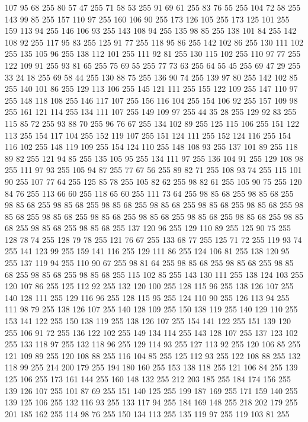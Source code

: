 107 95 68 255 80 57 47 255 71 58 53 255 91 69 61 255 83 76 55 255 104 72 58 255 143 99 85 255 157 110 97 255 160 106 90 255 173 126 105 255 173 125 101 255 159 113 94 255 146 106 93 255 143 108 94 255 135 98 85 255 138 101 84 255 142 108 92 255 117 95 83 255 125 91 77 255 118 95 86 255 142 102 86 255 130 111 102 255 135 105 96 255 138 112 101 255 111 92 81 255 130 115 102 255 110 97 77 255 122 109 91 255 93 81 65 255 75 69 55 255 77 73 63 255 64 55 45 255 69 47 29 255 33 24 18 255 69 58 44 255 130 88 75 255 136 90 74 255 139 97 80 255 142 102 85 255 140 101 86 255 129 113 106 255 145 121 111 255 155 122 109 255 147 110 97 255 148 118 108 255 146 117 107 255 156 116 104 255 154 106 92 255 157 109 98 255 161 121 114 255 134 111 107 255 149 109 97 255 44 35 28 255 129 92 83 255 115 85 72 255 93 88 70 255 96 76 67 255 134 102 89 255 125 115 106 255 151 122 113 255 154 117 104 255 152 119 107 255 151 124 111 255 152 124 116 255
154 116 102 255 148 119 109 255 154 124 110 255 148 108 93 255 137 101 89 255 118 89 82 255 121 94 85 255 135 105 95 255 134 111 97 255 136 104 91 255 129 108 98 255 111 97 93 255 105 94 87 255 77 67 56 255 89 82 71 255 108 93 74 255 115 101 90 255 107 77 64 255 125 85 78 255 105 82 62 255 98 82 61 255 105 90 75 255 120 84 76 255 113 66 60 255 118 65 60 255 111 73 64 255 98 85 68 255 98 85 68 255 98 85 68 255 98 85 68 255 98 85 68 255 98 85 68 255 98 85 68 255 98 85 68 255 98 85 68 255 98 85 68 255 98 85 68 255 98 85 68 255 98 85 68 255 98 85 68 255 98 85 68 255 98 85 68 255 98 85 68 255 137 120 96 255 129 110 89 255 125 90 75 255 128 78 74 255 128 79 78 255 121 76 67 255 133 68 77 255 125 71 72 255 119 93 74 255 141 123 99 255 159 141 116 255 129 111 86 255 124 106 81 255 138 120 95 255 137 119 94 255 110 90 67 255 98 81 64 255 98 85 68 255 98 85 68 255 98 85 68 255 98 85 68 255
98 85 68 255 115 102 85 255 143 130 111 255 138 124 103 255 120 107 86 255 125 112 92 255 132 120 100 255 128 115 96 255 138 126 107 255 140 128 111 255 129 116 96 255 128 115 95 255 124 110 90 255 126 113 94 255 111 98 79 255 138 126 107 255 140 128 109 255 150 138 119 255 140 129 110 255 153 141 122 255 150 138 119 255 138 126 107 255 154 141 122 255 151 139 120 255 106 91 72 255 136 122 102 255 149 134 114 255 143 128 107 255 137 123 102 255 133 118 97 255 132 118 96 255 129 114 93 255 127 113 92 255 120 106 85 255 121 109 89 255 120 108 88 255 116 104 85 255 125 112 93 255 122 108 88 255 132 118 99 255 214 200 179 255 194 180 160 255 153 138 118 255 121 106 84 255 139 125 106 255 173 161 144 255 160 148 132 255 212 203 185 255 184 174 156 255 139 126 107 255 101 87 69 255 151 140 125 255 199 187 169 255 171 159 140 255 139 125 106 255 132 116 93 255 133 117 94 255 184 169 148 255 218 202 179 255 201 185 162 255 114 98 76 255 150 134 113 255 135 119 97 255 119 103 81 255
